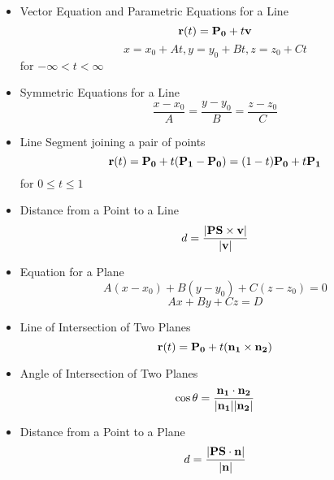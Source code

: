     \begin{itemize}
    \item Vector Equation and Parametric Equations for a Line
      \[\mathbf{r}(t) = \mathbf{P_0} + t\mathbf{v}\]
      \[x = x_0 + At, y = y_0 + Bt, z = z_0 + Ct\] for $-\infty < t < \infty$

    \item Symmetric Equations for a Line
      \[\frac{x-x_0}{A}=\frac{y-y_0}{B}=\frac{z-z_0}{C}\]
    
    \item Line Segment joining a pair of points
      \[\mathbf{r}(t) = \mathbf{P_0} + t(\mathbf{P_1}-\mathbf{P_0})=(1-t)\mathbf{P_0}+t\mathbf{P_1}\] for $0 \leq t \leq 1$
    
    \item Distance from a Point to a Line
      \[d = \frac{|\mathbf{PS} \times \mathbf{v}|}{|\mathbf{v}|}\]
    
    \item Equation for a Plane
      \[A(x-x_0) + B(y-y_0) + C(z-z_0) = 0\]
      \[Ax+By+Cz = D\]
    
    \item Line of Intersection of Two Planes
      \[\mathbf{r}(t) = \mathbf{P_0} + t(\mathbf{n_1} \times \mathbf{n_2})\]

    \item Angle of Intersection of Two Planes
      \[\cos\theta = \frac{\mathbf{n_1}\cdot\mathbf{n_2}}{|\mathbf{n_1}||\mathbf{n_2}|}\]
    
    \item Distance from a Point to a Plane
      \[d = \frac{|\mathbf{PS} \cdot \mathbf{n}|}{|\mathbf{n}|}\]

    
    \end{itemize}


\newpage

